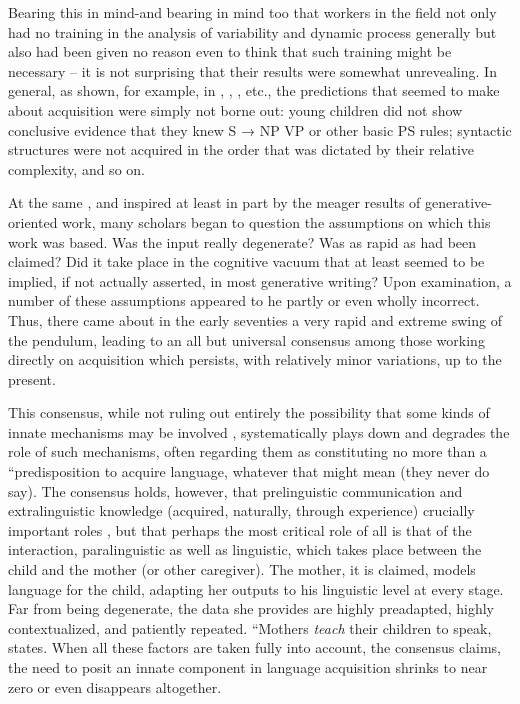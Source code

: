 Bearing this in mind-and bearing in mind too that workers in the field not only had no training in the analysis of variability and dynamic process generally but also had been given no reason even to think that such training might be necessary -- it is not surprising that their results were somewhat unrevealing. In general, as shown, for example, in \citet{BrownEtAl1970}, \citet{Brown1973}, \citet{Bowerman1973}, etc., the predictions that  seemed to make about acquisition were simply not borne out: young children did not show conclusive evidence that they knew S → NP VP or other basic PS
rules; syntactic structures were not acquired in the order that was dictated by their relative complexity, and so on.

At the same , and inspired at least in part by the meager results of generative-oriented work, many scholars began to question the assumptions on which this work was based. Was the input really degenerate? Was  as rapid as had been claimed? Did it take place in the cognitive vacuum that at least seemed to be implied, if not actually asserted, in most generative writing? Upon examination, a number of these assumptions appeared to he partly or even wholly incorrect. Thus, there came about in the early seventies a very rapid and extreme swing of the pendulum, leading to an all but universal consensus among those working directly on acquisition which persists, with relatively minor variations, up to the present.

This consensus, while not ruling out entirely the possibility that some kinds of innate mechanisms may be involved , systematically plays down and degrades the role of such mechanisms, often regarding them as constituting no more than a ``predisposition to acquire language, whatever that might mean (they never do say). The consensus holds, however, that prelinguistic communication and extralinguistic knowledge (acquired, naturally, through experience)  crucially important roles , but that perhaps the most critical role of all is that of the interaction, paralinguistic as well as linguistic, which takes place between the child and the mother (or other caregiver). The mother, it is claimed, models language for the child, adapting her outputs to his linguistic level at every stage. Far from being degenerate, the data she provides are highly preadapted, highly contextualized, and patiently repeated. ``Mothers \textit{teach} their children to speak, \citet{Bruner1979} states. When all these factors are taken fully into account, the consensus claims, the need to posit an innate component in language acquisition shrinks to near zero or even disappears altogether.

